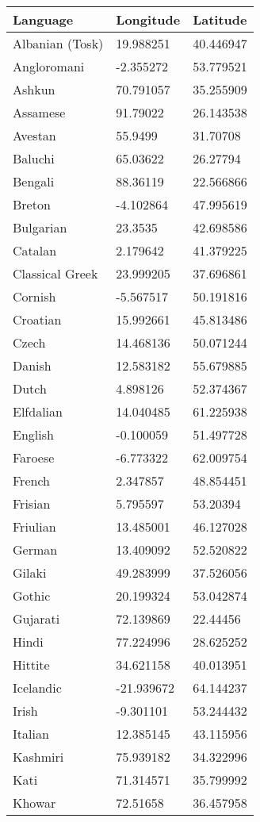 \begin{longtable}{lll}
\toprule
Language & Longitude & Latitude\\
\midrule
Albanian (Tosk) & 19.988251 & 40.446947\\
Angloromani & -2.355272 & 53.779521\\
Ashkun & 70.791057 & 35.255909\\
Assamese & 91.79022 & 26.143538\\
Avestan & 55.9499 & 31.70708\\
Baluchi & 65.03622 & 26.27794\\
Bengali & 88.36119 & 22.566866\\
Breton & -4.102864 & 47.995619\\
Bulgarian & 23.3535 & 42.698586\\
Catalan & 2.179642 & 41.379225\\
Classical Greek & 23.999205 & 37.696861\\
Cornish & -5.567517 & 50.191816\\
Croatian & 15.992661 & 45.813486\\
Czech & 14.468136 & 50.071244\\
Danish & 12.583182 & 55.679885\\
Dutch & 4.898126 & 52.374367\\
Elfdalian & 14.040485 & 61.225938\\
English & -0.100059 & 51.497728\\
Faroese & -6.773322 & 62.009754\\
French & 2.347857 & 48.854451\\
Frisian & 5.795597 & 53.20394\\
Friulian & 13.485001 & 46.127028\\
German & 13.409092 & 52.520822\\
Gilaki & 49.283999 & 37.526056\\
Gothic & 20.199324 & 53.042874\\
Gujarati & 72.139869 & 22.44456\\
Hindi & 77.224996 & 28.625252\\
Hittite & 34.621158 & 40.013951\\
Icelandic & -21.939672 & 64.144237\\
Irish & -9.301101 & 53.244432\\
Italian & 12.385145 & 43.115956\\
Kashmiri & 75.939182 & 34.322996\\
Kati & 71.314571 & 35.799992\\
Khowar & 72.51658 & 36.457958\\

\end{longtable}
